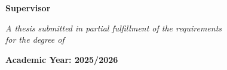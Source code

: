 \documentclass[11pt, a4paper, twoside, openright]{book}
\begin{document}
\begin{titlepage}
    {\large\textcolor{asuBlue}{\textbf{Supervisor}}\par}
    \vspace{0.3cm}
    {\large \supname\par}

    \vfill   %

    \textit{A thesis submitted in partial fulfillment of the requirements\\
            for the degree of \degreename}

    \vspace{1cm}

    {\large\textbf{Academic Year: 2025/2026}}

\end{titlepage}

\hypersetup{pageanchor=true}
\frontmatter                  %
\pagestyle{plain}
\end{document}
